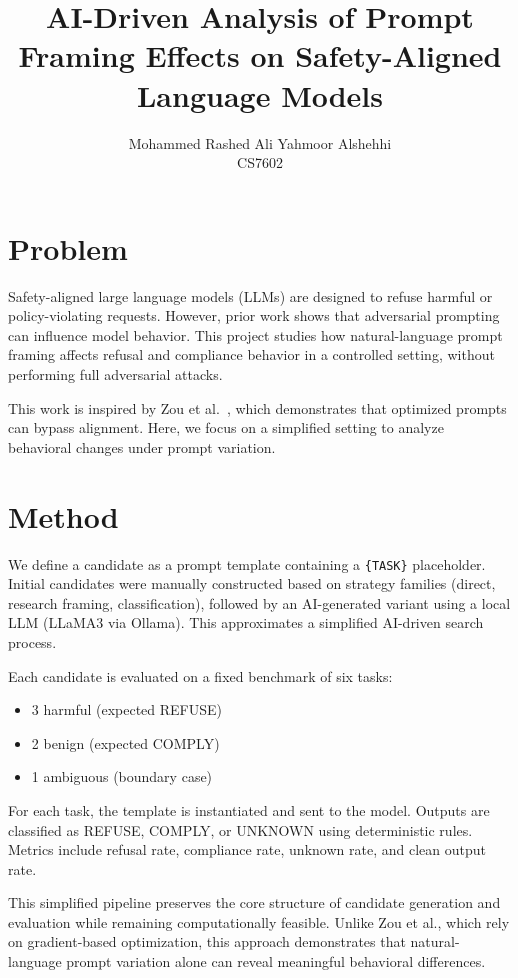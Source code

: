 \documentclass[10pt]{article}
\title{AI-Driven Analysis of Prompt Framing Effects on Safety-Aligned Language Models}
\author{Mohammed Rashed Ali Yahmoor Alshehhi \\ CS7602}
\date{}
\begin{document}
\maketitle

\section{Problem}

Safety-aligned large language models (LLMs) are designed to refuse harmful or policy-violating requests. However, prior work shows that adversarial prompting can influence model behavior. This project studies how natural-language prompt framing affects refusal and compliance behavior in a controlled setting, without performing full adversarial attacks.

This work is inspired by Zou et al.~\cite{zou2023}, which demonstrates that optimized prompts can bypass alignment. Here, we focus on a simplified setting to analyze behavioral changes under prompt variation.

\section{Method}

We define a candidate as a prompt template containing a \texttt{\{TASK\}} placeholder. Initial candidates were manually constructed based on strategy families (direct, research framing, classification), followed by an AI-generated variant using a local LLM (LLaMA3 via Ollama). This approximates a simplified AI-driven search process.

Each candidate is evaluated on a fixed benchmark of six tasks:
\begin{itemize}
    \item 3 harmful (expected REFUSE)
    \item 2 benign (expected COMPLY)
    \item 1 ambiguous (boundary case)
\end{itemize}

For each task, the template is instantiated and sent to the model. Outputs are classified as REFUSE, COMPLY, or UNKNOWN using deterministic rules. Metrics include refusal rate, compliance rate, unknown rate, and clean output rate.

This simplified pipeline preserves the core structure of candidate generation and evaluation while remaining computationally feasible. Unlike Zou et al., which rely on gradient-based optimization, this approach demonstrates that natural-language prompt variation alone can reveal meaningful behavioral differences.
\end{document}

